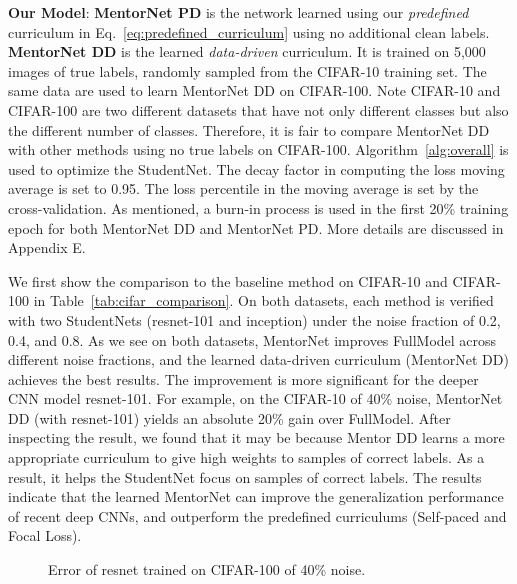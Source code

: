 \documentclass{article}
\begin{document}
\noindent \textbf{Our Model}: \textbf{MentorNet PD} is the network learned using our \emph{predefined} curriculum in Eq.~\eqref{eq:predefined_curriculum} using no additional clean labels. \textbf{MentorNet DD} is the learned \emph{data-driven} curriculum. It is trained on 5,000 images of true labels, randomly sampled from the CIFAR-10 training set. The same data are used to learn MentorNet DD on CIFAR-100. Note CIFAR-10 and CIFAR-100 are two different datasets that have not only different classes but also the different number of classes. Therefore, it is fair to compare MentorNet DD with other methods using no true labels on CIFAR-100. Algorithm~\ref{alg:overall} is used to optimize the StudentNet. The decay factor in computing the loss moving average is set to 0.95. The loss percentile in the moving average is set by the cross-validation. As mentioned, a burn-in process is used in the first 20\% training epoch for both MentorNet DD and MentorNet PD. More details are discussed in Appendix E.

We first show the comparison to the baseline method on CIFAR-10 and CIFAR-100 in Table~\ref{tab:cifar_comparison}. On both datasets, each method is verified with two StudentNets (resnet-101 and inception) under the noise fraction of 0.2, 0.4, and 0.8. As we see on both datasets, MentorNet improves FullModel across different noise fractions, and the learned data-driven curriculum (MentorNet DD) achieves the best results. The improvement is more significant for the deeper CNN model resnet-101. For example, on the CIFAR-10 of 40\% noise, MentorNet DD (with resnet-101) yields an absolute 20\% gain over FullModel. After inspecting the result, we found that it may be because Mentor DD learns a more appropriate curriculum to give high weights to samples of correct labels. As a result, it helps the StudentNet focus on samples of correct labels. The results indicate that the learned MentorNet can improve the generalization performance of recent deep CNNs, and outperform the predefined curriculums (Self-paced and Focal Loss).

\begin{figure}[ht]
\vspace{-2mm}
\centering
{}
\vspace{-5mm}
\caption{\label{fig:exp_generation}Error of resnet trained on CIFAR-100 of 40\% noise.}
\vspace{-7mm}
\end{figure}
\end{document}
